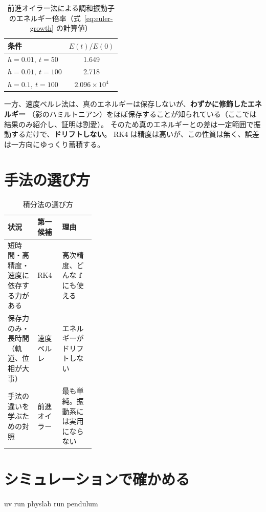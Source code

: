 \begin{table}[htbp]
\centering
\caption{前進オイラー法による調和振動子のエネルギー倍率（式~\eqref{eq:euler-growth} の計算値）}
\label{tab:euler-growth}
\begin{tabular}{lc}
\toprule
条件 & $E(t)/E(0)$ \\
\midrule
$h=0.01,\ t=50$  & 1.649 \\
$h=0.01,\ t=100$ & 2.718 \\
$h=0.1,\ t=100$  & $2.096\times10^{4}$ \\
\bottomrule
\end{tabular}
\end{table}

一方、速度ベルレ法は、真のエネルギーは保存しないが、\textbf{わずかに修飾したエネルギー}
（影のハミルトニアン）をほぼ保存することが知られている（ここでは結果のみ紹介し、証明は割愛）。
そのため真のエネルギーとの差は一定範囲で振動するだけで、\textbf{ドリフトしない}。
RK4 は精度は高いが、この性質は無く、誤差は一方向にゆっくり蓄積する。

\section{手法の選び方}\label{sec:choice}

\begin{table}[htbp]
\centering
\caption{積分法の選び方}\label{tab:choice}
\begin{tabularx}{\linewidth}{>{\raggedright\arraybackslash}p{0.34\linewidth}lX}
\toprule
状況 & 第一候補 & 理由 \\
\midrule
短時間・高精度・速度に依存する力がある & RK4 & 高次精度、どんな $\mathbf f$ にも使える \\
保存力のみ・長時間（軌道、位相が大事） & 速度ベルレ & エネルギーがドリフトしない \\
手法の違いを学ぶための対照 & 前進オイラー & 最も単純。振動系には実用にならない \\
\bottomrule
\end{tabularx}
\end{table}

\section{シミュレーションで確かめる}\label{sec:sim-ode}

\begin{simbox}
\begin{terminal}
uv run physlab run pendulum
\end{terminal}
\end{simbox}

